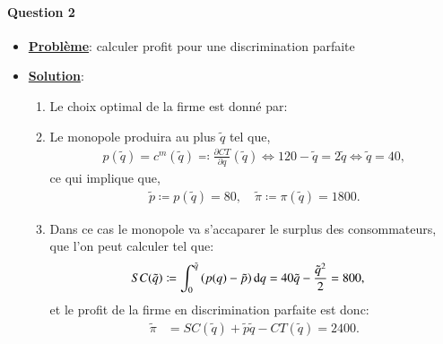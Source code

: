  \begin{frame}
  [allowframebreaks]{\insertsection}
  \framesubtitle{Question 2\\}
  \begin{itemize}
    \item \textbf{\underline{Problème}}: calculer  profit pour une discrimination parfaite
    \item \textbf{\underline{Solution}}: 
    \begin{enumerate}[$\cdot$]
      \item Le choix optimal de la firme est donné par:
      \item Le monopole produira  au plus $\tilde{q}$ tel que,
      \begin{align*}
        p(\tilde{q}) = c^m(\tilde{q}) \eqqcolon \frac{\partial CT}{\partial q}(\tilde{q}) 
        \Leftrightarrow  120 - \tilde{q} = 2\tilde{q}  \Leftrightarrow \tilde{q} = 40,
      \end{align*}
      ce qui implique que,
      \begin{align*}
        \tilde{p} \coloneqq p(\tilde{q}) = 80, \quad \tilde{\pi} \coloneqq \pi(\tilde{q}) = 1800.
        \end{align*}
      \item Dans ce cas le monopole va s’accaparer le surplus des consommateurs, que l’on peut calculer tel que:
       \begin{align*}
        SC(\tilde{q}) &\coloneqq\int_0^{\tilde{q}}\left({p(q) - \tilde{p}}\right)\mathop{}\!\mathrm{d} q =40\tilde{q} - \frac{\tilde{q}^{2}}{2}  = 800,
       \end{align*}
       et le profit de la firme en discrimination parfaite est donc:
       \begin{align*}
        \tilde{\pi} &= SC(\tilde{q}) + \tilde{p}\tilde{q} - CT(\tilde{q}) = 2400.
       \end{align*}
       
    \end{enumerate}
  \end{itemize}

\end{frame}

